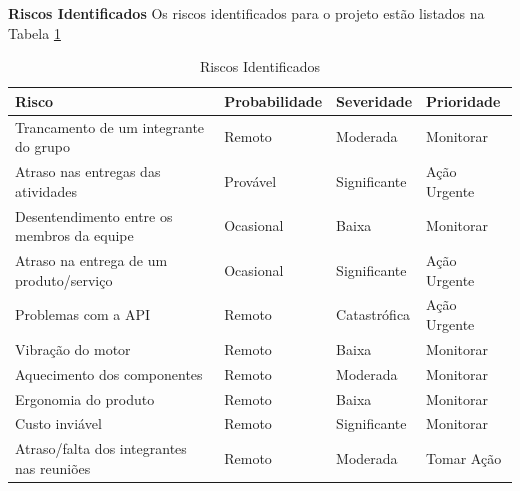 		\textbf{Riscos Identificados}
		Os riscos identificados para o projeto estão listados na Tabela \ref{riscos_identificados}
		
		\begin{table}[h!]
			\centering
			\caption{Riscos Identificados}
			\label{riscos_identificados}
			\begin{tabular}{|p{6cm}p{2cm}p{2cm}p{3cm}|}
				\hline
				\multicolumn{1}{|l|}{\textbf{Risco}}       & \multicolumn{1}{l|}{\textbf{Probabilidade}} & \multicolumn{1}{l|}{\textbf{Severidade}} & \textbf{Prioridade} \\ \hline
				Trancamento de um integrante do grupo      & Remoto                                      & Moderada                                 & Monitorar           \\ \hline
				Atraso nas entregas das atividades         & Provável                                    & Significante                             & Ação Urgente        \\ \hline
				Desentendimento entre os membros da equipe & Ocasional                                   & Baixa                                    & Monitorar           \\ \hline
				Atraso na entrega de um produto/serviço    & Ocasional                                   & Significante                             & Ação Urgente        \\ \hline
				Problemas com a API                        & Remoto                                      & Catastrófica                             & Ação Urgente        \\ \hline
				Vibração do motor                          & Remoto                                      & Baixa                                    & Monitorar           \\ \hline
				Aquecimento dos componentes                & Remoto                                      & Moderada                                 & Monitorar           \\ \hline
				Ergonomia do produto                       & Remoto                                      & Baixa                                    & Monitorar           \\ \hline
				Custo inviável                             & Remoto                                      & Significante                             & Monitorar           \\ \hline
				Atraso/falta dos integrantes nas reuniões  & Remoto                                      & Moderada                                 & Tomar Ação          \\ \hline
			\end{tabular}
		\end{table}
		
